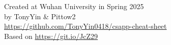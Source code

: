 \documentclass[twocolumn]{article}
\begin{document}


\vfill

\vfill
\begin{center}
    Created at Wuhan University in Spring 2025\\
    by TonyYin \& Pittow2\\
    \url{https://github.com/TonyYin0418/csapp-cheat-sheet}\\
    Based on \url{https://git.io/JcZ29}
\end{center}
\end{document}
